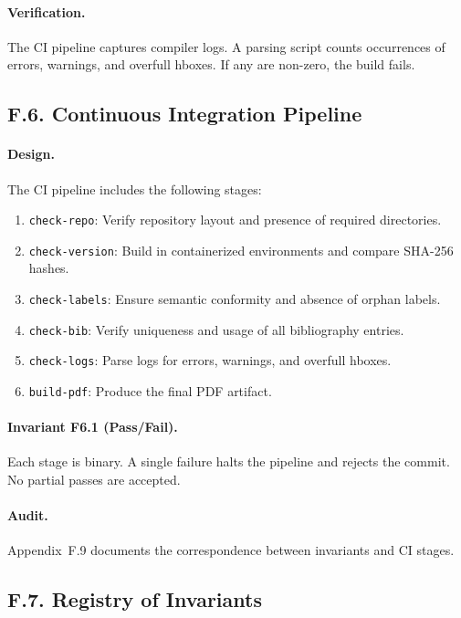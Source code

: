 \paragraph{Verification.} The CI pipeline captures compiler logs. A parsing script counts occurrences of errors, warnings, and overfull hboxes. If any are non-zero, the build fails.

\subsection*{F.6. Continuous Integration Pipeline}

\paragraph{Design.} The CI pipeline includes the following stages:
\begin{enumerate}
    \item \texttt{check-repo}: Verify repository layout and presence of required directories.
    \item \texttt{check-version}: Build in containerized environments and compare SHA-256 hashes.
    \item \texttt{check-labels}: Ensure semantic conformity and absence of orphan labels.
    \item \texttt{check-bib}: Verify uniqueness and usage of all bibliography entries.
    \item \texttt{check-logs}: Parse logs for errors, warnings, and overfull hboxes.
    \item \texttt{build-pdf}: Produce the final PDF artifact.
\end{enumerate}

\paragraph{Invariant F6.1 (Pass/Fail).} Each stage is binary. A single failure halts the pipeline and rejects the commit. No partial passes are accepted.

\paragraph{Audit.} Appendix~F.9 documents the correspondence between invariants and CI stages.

\subsection*{F.7. Registry of Invariants}

